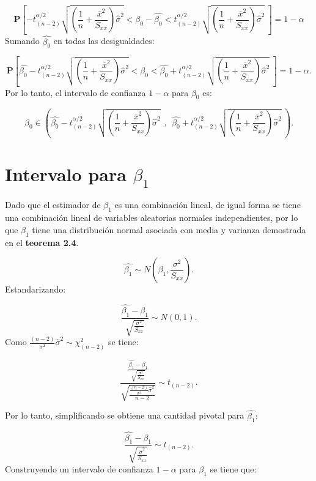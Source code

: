 \documentclass[
  a4paper,
  oneside,
  openany]{book}
\begin{document}
\[\mathbf{P}\left[-t^{\alpha/2}_{(n-2)}\sqrt{\left(\frac{1}{n}+\frac{\overline{x}^2}{S_{xx}}\right)\hat{\sigma}^2}<\beta_{0}-\hat{\beta_{0}}< t^{\alpha/2}_{(n-2)}\sqrt{\left(\frac{1}{n}+\frac{\overline{x}^2}{S_{xx}}\right)\hat{\sigma}^2} \ \right]=1-\alpha\]
Sumando \(\hat{\beta_{0}}\) en todas las desigualdades:

\[\mathbf{P}\left[\hat{\beta_{0}}-t^{\alpha/2}_{(n-2)}\sqrt{\left(\frac{1}{n}+\frac{\overline{x}^2}{S_{xx}}\right)\hat{\sigma}^2}<\beta_{0}< \hat{\beta_{0}}+t^{\alpha/2}_{(n-2)}\sqrt{\left(\frac{1}{n}+\frac{\overline{x}^2}{S_{xx}}\right)\hat{\sigma}^2} \ \right]=1-\alpha.\]
Por lo tanto, el intervalo de confianza \(1-\alpha\) para \(\beta_{0}\) es:

\[\beta_{0} \in \left( \hat{\beta_{0}}-t^{\alpha/2}_{(n-2)}\sqrt{\left(\frac{1}{n}+\frac{\overline{x}^2}{S_{xx}}\right)\hat{\sigma}^2} \ \ , \ \ \hat{\beta_{0}}+t^{\alpha/2}_{(n-2)}\sqrt{\left(\frac{1}{n}+\frac{\overline{x}^2}{S_{xx}}\right)\hat{\sigma}^2} \  \right).\]

\hypertarget{intervalo-para-beta_1}{%
\section{\texorpdfstring{Intervalo para \(\beta_{1}\)}{Intervalo para \textbackslash beta\_\{1\}}}\label{intervalo-para-beta_1}}

Dado que el estimador de \(\beta_{1}\) es una combinación lineal, de igual forma se tiene una combinación lineal de variables aleatorias normales independientes, por lo que \(\beta_{1}\) tiene una distribución normal asociada con media y varianza demostrada en el \textbf{teorema 2.4}.

\[\hat{\beta_{1}}\sim N \left(\beta_{1},\frac{\sigma^2}{S_{xx}}\right).\]
Estandarizando:

\[\frac{\hat{\beta_{1}}-\beta_{1}}{\sqrt{\frac{\sigma^2}{S_{xx}}}}\sim N(0,1).\]
Como \(\frac{(n-2)}{\sigma^2}\hat{\sigma}^2\sim\chi^2_{(n-2)}\) se tiene:

\[\frac{\frac{\hat{\beta_{1}}-\beta_{1}}{\sqrt{\frac{\sigma^2}{S_{xx}}}}}{\sqrt{\frac{\frac{(n-2)}{\sigma^2}\hat{\sigma}^2}{n-2}}} \sim t_{(n-2)}.\]

Por lo tanto, simplificando se obtiene una cantidad pivotal para \(\hat{\beta_{1}}:\)

\[\frac{\hat{\beta_{1}}-\beta_{1}}{\sqrt{\frac{\hat{\sigma}^2}{S_{xx}}}}\sim t_{(n-2)}.\]
Construyendo un intervalo de confianza \(1-\alpha\) para \(\beta_{1}\) se tiene que:
\end{document}
